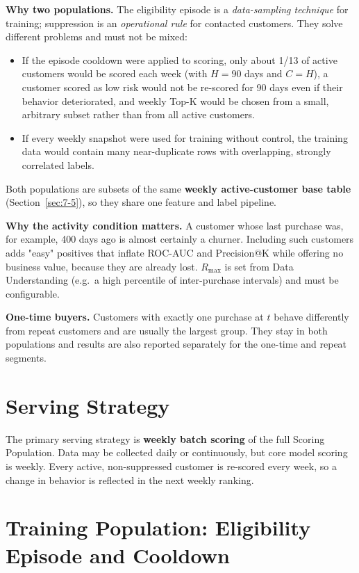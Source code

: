 \textbf{Why two populations.} The eligibility episode is a \emph{data-sampling technique} for training; suppression is an \emph{operational rule} for contacted customers. They solve different problems and must not be mixed:

\begin{itemize}
    \item If the episode cooldown were applied to scoring, only about 1/13 of active customers would be scored each week (with $H = 90$ days and $C = H$), a customer scored as low risk would not be re-scored for 90 days even if their behavior deteriorated, and weekly Top-K would be chosen from a small, arbitrary subset rather than from all active customers.
    \item If every weekly snapshot were used for training without control, the training data would contain many near-duplicate rows with overlapping, strongly correlated labels.
\end{itemize}

Both populations are subsets of the same \textbf{weekly active-customer base table} (Section~\ref{sec:7-5}), so they share one feature and label pipeline.

\textbf{Why the activity condition matters.} A customer whose last purchase was, for example, 400 days ago is almost certainly a churner. Including such customers adds "easy" positives that inflate ROC-AUC and Precision@K while offering no business value, because they are already lost. $R_{\max}$ is set from Data Understanding (e.g.\ a high percentile of inter-purchase intervals) and must be configurable.

\textbf{One-time buyers.} Customers with exactly one purchase at $t$ behave differently from repeat customers and are usually the largest group. They stay in both populations and results are also reported separately for the one-time and repeat segments.

\section{Serving Strategy}
\label{sec:3-8}

The primary serving strategy is \textbf{weekly batch scoring} of the full Scoring Population. Data may be collected daily or continuously, but core model scoring is weekly. Every active, non-suppressed customer is re-scored every week, so a change in behavior is reflected in the next weekly ranking.

\section{Training Population: Eligibility Episode and Cooldown}
\label{sec:3-9}

